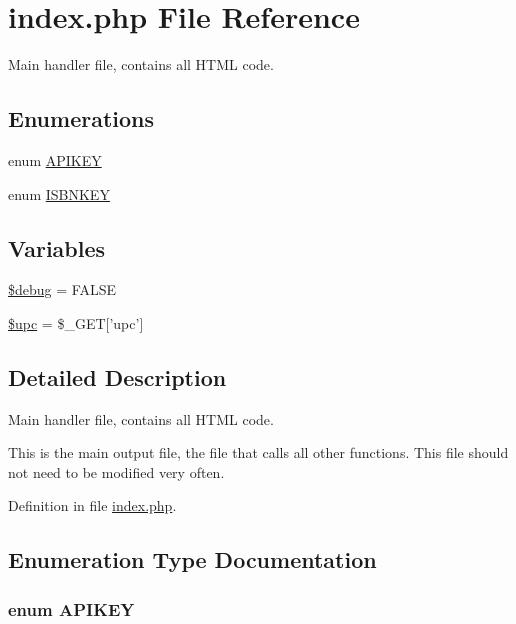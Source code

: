 \hypertarget{index_8php}{
\section{index.php File Reference}
\label{index_8php}
}
Main handler file, contains all HTML code. 

\subsection*{Enumerations}
\begin{CompactItemize}
\item 
enum \hyperlink{index_8php_cb68d0635f57ee9137fb7985a2357c5c}{APIKEY} 
\item 
enum \hyperlink{index_8php_93bb4a6cf53ca9db8d391bc20eee6442}{ISBNKEY} 
\end{CompactItemize}
\subsection*{Variables}
\begin{CompactItemize}
\item 
\hyperlink{index_8php_85ae3e64cd40e9564adceb010085e9dd}{\$debug} = FALSE
\item 
\hyperlink{index_8php_a9aa17ff51d69075d75cfc5bc4e89b34}{\$upc} = \$\_\-GET\mbox{[}'upc'\mbox{]}
\end{CompactItemize}


\subsection{Detailed Description}
Main handler file, contains all HTML code. 

This is the main output file, the file that calls all other functions. This file should not need to be modified very often. 

Definition in file \hyperlink{index_8php-source}{index.php}.

\subsection{Enumeration Type Documentation}
\hypertarget{index_8php_cb68d0635f57ee9137fb7985a2357c5c}{
\subsubsection{\setlength{\rightskip}{0pt plus 5cm}enum {\bf APIKEY}}}
\label{index_8php_cb68d0635f57ee9137fb7985a2357c5c}


